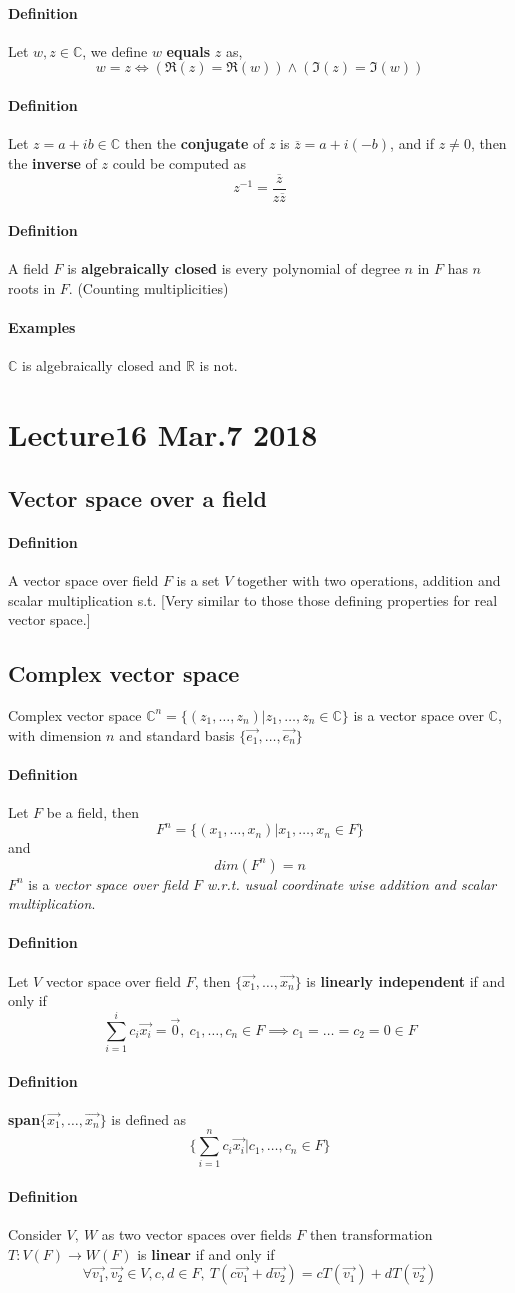\documentclass[11pt]{article}
\newcommand{\trans}[3]{{#1}: {#2} \to {#3}}
\newcommand{\R}[0]{\mathbb{R}}
\newcommand{\vset}[3]{\{\vec{{#1}_{#2}}, \dots, \vec{{#1}_{#3}}\}}
\newcommand{\definition}[0]{\paragraph{Definition}}
\newcommand{\C}[0]{\mathbb{C}}
\begin{document}
	\definition Let $w, z \in \C$, we define $w$ \textbf{equals} $z$ as, 
	\[
		w = z \iff (\Re(z) = \Re(w)) \land (\Im(z) = \Im(w))
	\]
	
	\definition Let $z = a + ib \in \C$ then the \textbf{conjugate} of $z$ is $\overline{z} = a + i(-b) $, and if $z \neq 0$, then the \textbf{inverse} of $z$ could be computed as
	\[
	z^{-1} = \frac{\overline{z}}{z \overline{z}}
	\]
	
	\definition A field $F$ is \textbf{algebraically closed} is every polynomial of degree $n$ in $F$ has $n$ roots in $F$. (Counting multiplicities)
	
	\paragraph{Examples} $\C$ is algebraically closed and $\R$ is not. 
	
	\section{Lecture16 Mar.7 2018}
	\subsection{Vector space over a field}
	\definition A vector space over field $F$ is a set $V$ together with two operations, addition and scalar multiplication s.t. [Very similar to those those defining properties for real vector space.]
	\subsection{Complex vector space} Complex vector space $\C^n = \{(z_1,\dots,z_n)\vert z_1,\dots,z_n\in\C\}$ is a vector space over $\C$, with dimension $n$ and standard basis $\vset{e}{1}{n}$
	\definition Let $F$ be a field, then 
	\[
		F^n = \{(x_1,\dots,x_n)\vert x_1,\dots,x_n \in F\}
	\] and 
	\[
		dim(F^n) = n
	\] $F^n$ is a \emph{vector space over field $F$ w.r.t. usual coordinate wise addition and scalar multiplication}.
	\definition Let $V$ vector space over field $F$, then $\vset{x}{1}{n}$ is \textbf{linearly independent} if and only if 
	\[
		\sum_{i=1}^{i}{c_i \vec{x_i}} = \vec{0},\ c_1, \dots, c_n \in F \implies c_1=\dots = c_2 = 0 \in F
	\]
	\definition \textbf{span}$\vset{x}{1}{n}$ is defined as 
	\[
		\{\sum_{i=1}^n{c_i\vec{x_i}}\vert c_1,\dots,c_n \in F\}
	\]
	\definition Consider $V,\ W$ as two vector spaces over fields $F$ then transformation $\trans{T}{V(F)}{W(F)}$ is \textbf{linear} if and only if 
	\[
	\forall \vec{v_1},\vec{v_2} \in V, c,d \in F,\ T(c\vec{v_1} + d\vec{v_2}) = cT(\vec{v_1}) + dT(\vec{v_2})
	\]
	
\end{document}
